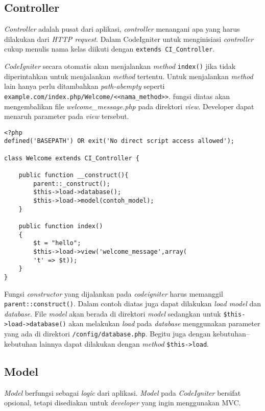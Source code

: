 \subsection{Controller}

\textit{Controller} adalah pusat dari aplikasi, \textit{controller} menangani apa yang harus dilakukan dari \textit{HTTP request}. Dalam CodeIgniter untuk menginisiasi \textit{controller} cukup menulis nama kelas diikuti dengan \texttt{extends CI\_Controller}.

\textit{CodeIgniter} secara otomatis akan menjalankan \textit{method} \texttt{index()} jika tidak diperintahkan untuk menjalankan \textit{method} tertentu. Untuk menjalankan \textit{method} lain hanya perlu ditambahkan \textit{path-abempty} seperti  \texttt{example.com/index.php/Welcome/<<nama\_method>>}.
fungsi diatas akan mengembalikan file \textit{welcome\_message.php} pada direktori \textit{view}. Developer dapat menaruh parameter pada \textit{view} tersebut.

\begin{lstlisting}
<?php
defined('BASEPATH') OR exit('No direct script access allowed');
	
class Welcome extends CI_Controller {
	
	public function __construct(){
		parent::_construct();
		$this->load->database();
		$this->load->model(contoh_model);
	}
	
	public function index()
	{
		$t = "hello";
		$this->load->view('welcome_message',array(
		't' => $t));
	}
}
\end{lstlisting}


Fungsi \textit{constructor} yang dijalankan pada \textit{codeigniter} harus memanggil \texttt{parent::construct()}. Dalam contoh diatas juga dapat dilakukan \textit{load model} dan \textit{database}. File \textit{model} akan berada di direktori \textit{model} sedangkan untuk \texttt{\$this->load->database()} akan melakukan \textit{load} pada \textit{database} menggunakan parameter yang ada di direktori \texttt{/config/database.php}. Begitu juga dengan kebutuhan--kebutuhan lainnya dapat dilakukan dengan \textit{method} \texttt{\$this->load}.


\subsection{Model}

\textit{Model} berfungsi sebagai \textit{logic} dari aplikasi. \textit{ Model} pada \textit{CodeIgniter} bersifat opsional, tetapi disediakan untuk \textit{developer} yang ingin menggunakan MVC\cite{codeigniter3}. 


